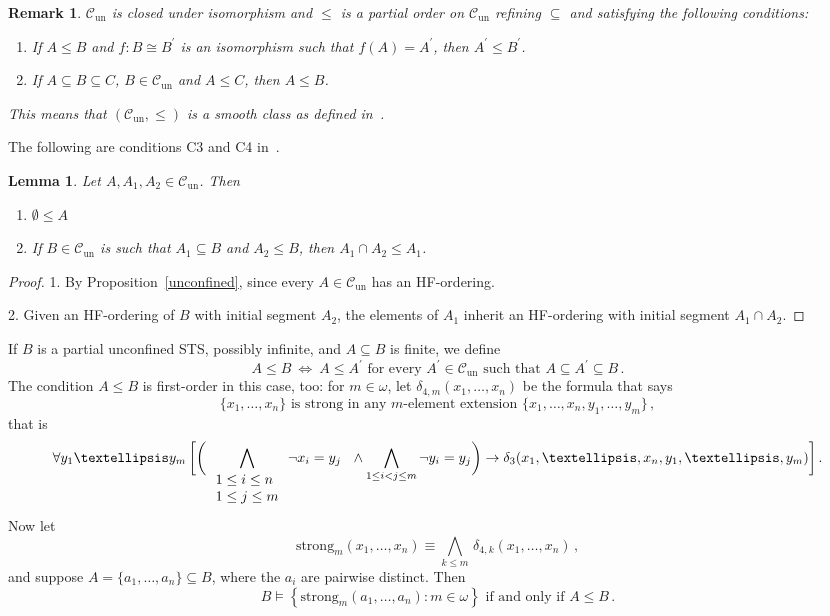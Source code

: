 \documentclass[a4paper, 11pt]{article}
\newcommand{\Cun}{\mathcal{C}_\mathrm{un}}
\newcommand{\strong}{\mathrm{strong}}
\theoremstyle{note}
\newtheorem{lemma}[thm]{Lemma}
\newtheorem{rmk}[thm]{Remark}
\begin{document}
\begin{rmk}
	$\Cun$ is closed under isomorphism
	and $\leq$ is a partial order on $\Cun$ refining $\subseteq$ and satisfying  the following conditions:
	\begin{enumerate}
		\item If $A\leq B$ and $f:B\cong B^{\prime}$ is an isomorphism such
		that $f(A)=A^{\prime}$, then $A^{\prime}\leq B^{\prime}$.
		\item If $A\subseteq B\subseteq C$, $B\in \Cun$ and $A\leq C$, then $A\leq B$.
	\end{enumerate}
	This means that $(\Cun,\leq)$ is a \textit{smooth class} as defined in~\cite{kue-lask}.
\end{rmk}

The following are conditions C3 and  C4 in~\cite{wagner}.

\begin{lemma}\label{diamond} Let $A,A_1,A_2 \in \Cun$. Then
	\begin{enumerate}
		\item $\emptyset \leq A$  
	\item If $B\in \Cun$ is such that $A_1\subseteq B$ and $A_2\leq B$, then $A_1\cap A_2\leq A_1$.
	\end{enumerate}
\end{lemma}

\begin{proof} 1. By Proposition~\ref{unconfined},  since every $A\in \Cun$ has an HF-ordering.
	
	2. Given an HF-ordering of $B$ with initial segment $A_2$, the elements of $A_1$ inherit an HF-ordering with initial segment $A_1\cap A_2$.
\end{proof}
 


If $B$ is a partial unconfined STS, possibly infinite,   and $A \subseteq B$ is finite, we define
\[ A \leq B \ \Leftrightarrow \ A \leq A^\prime \mbox{ for every } A^\prime \in \Cun \mbox{ such that } A \subseteq A^\prime \subseteq B \, . \]
 The condition $A \leq B$ is first-order in this case, too: for $m \in \omega$, let $\delta_{4,m}(x_1, \ldots, x_n) $ be the formula that says 
$$\{x_1, \ldots, x_n\} \mbox{ is strong in any }m\mbox{-element extension }\{x_1, \ldots, x_n, y_1, \ldots, y_m\}\, ,$$
  that is
$$ \forall y_1 \ldots y_m \, \bigg[ \bigg( \bigwedge_{\tiny \begin{array}{l} 1 \leq i \leq n \\ 1 \leq j \leq m \end{array}} \neg x_i=y_j \ \ \wedge \bigwedge_{1\leq i <j \leq m} \neg y_i=y_j \bigg) \rightarrow \delta_3(x_1, \ldots, x_n, y_1, \ldots, y_m) \bigg] \,. $$
Now let 
$$\strong_m(x_1, \ldots, x_n) \equiv \bigwedge_{k\leq m} \, \delta_{4,k}(x_1, \ldots, x_n) \, ,$$
and suppose $A=\{a_1, \ldots, a_n \} \subseteq B$, where the $a_i$ are pairwise distinct. Then
$$B \models \left\{\strong_m(a_1, \ldots, a_n) : m\in \omega \right\} \mbox{ if and only if } A \leq B \, .$$
\end{document}
